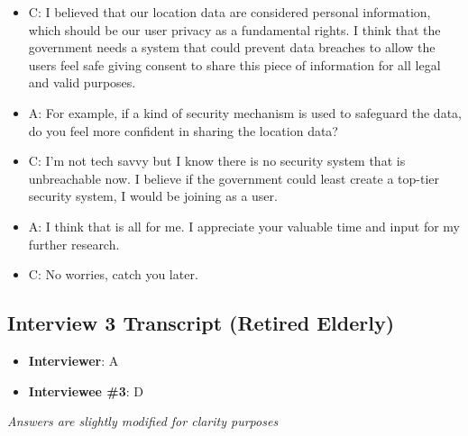 \begin{appendices}
\begin{itemize}
        \item C: I believed that our location data are considered personal information, which should be our
        user privacy as a fundamental rights. I think that the government needs a system that could
        prevent data breaches to allow the users feel safe giving consent to share this piece of
        information for all legal and valid purposes.
        \item A: For example, if a kind of security mechanism is used to safeguard the data, do you feel more
        confident in sharing the location data?
        \item C: I’m not tech savvy but I know there is no security system that is unbreachable now. I believe
        if the government could least create a top-tier security system, I would be joining as a user.
        \item A: I think that is all for me. I appreciate your valuable time and input for my further research.
        \item C: No worries, catch you later.
      \end{itemize}
  
    \subsection{Interview 3 Transcript (Retired Elderly)}
      \begin{itemize}
        \item \textbf{Interviewer}: A
        \item \textbf{Interviewee \#3}: D
      \end{itemize}
      \par \textit{Answers are slightly modified for clarity purposes}


\end{appendices}
